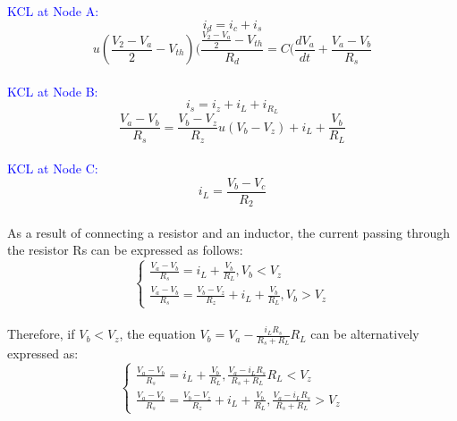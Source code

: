 \textcolor{blue}{KCL at Node A:}\\
\begin{equation}
    i_d=i_c+i_s
\end{equation}
\begin{equation}
    u(\frac{V_2-V_a}{2}-V_{th})(\frac{\frac{V_2-V_a}{2}-V_{th}}{R_d}=C(\frac{dV_a}{dt}+\frac{V_a-V_b}{R_s}
\end{equation}\\

\textcolor{blue}{KCL at Node B:}\\
\begin{equation}
    i_s=i_z+i_L+i_{R_L}
\end{equation}
\begin{equation}
    \frac{V_a-V_b}{R_s}=\frac{V_b-V_z}{R_z}u(V_b-V_z)+i_L+\frac{V_b}{R_L}
\end{equation}\\

\textcolor{blue}{KCL at Node C:}\\
\begin{equation}
    i_L=\frac{V_b-V_c}{R_2}
\end{equation}\\

As a result of connecting a resistor and an inductor, the current passing through the resistor Rs can be expressed as follows:\\

\begin{equation}
    \begin{cases}
        \frac{V_a-V_b}{R_s}=i_L+\frac{V_b}{R_L},  V_b<V_z\\
        \frac{V_a-V_b}{R_s}=\frac{V_b-V_z}{R_z}+i_L+\frac{V_b}{R_L},  V_b>V_z
    \end{cases}
\end{equation}\\

Therefore, if $V_b < V_z$, the equation $V_b = V_a - \frac{i_L R_s}{R_s+R_L} R_L$ can be alternatively expressed as:\\

\begin{equation}
    \begin{cases}
        \frac{V_a-V_b}{R_s}=i_L+\frac{V_b}{R_L},  \frac{V_a-i_LR_s}{R_s+R_L}R_L<V_z\\
        \frac{V_a-V_b}{R_s}=\frac{V_b-V_z}{R_z}+i_L+\frac{V_b}{R_L},  \frac{V_a-i_LR_s}{R_s+R_L}>V_z
    \end{cases}
\end{equation}\\

